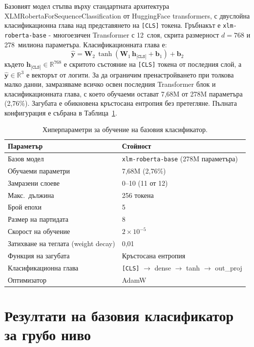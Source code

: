 \documentclass[12pt,a4paper]{report}
\begin{document}
Базовият модел стъпва върху стандартната архитектура XLMRobertaForSequenceClassification от HuggingFace transformers, с двуслойна класификационна глава над представянето на \texttt{[CLS]} токена. Гръбнакът е \texttt{xlm-roberta-base} - многоезичен Transformer с 12~слоя, скрита размерност $d=768$ и 278~милиона параметъра. Класификационната глава е:
\begin{equation}
  \hat{\mathbf{y}} = \mathbf{W}_2 \, \tanh(\mathbf{W}_1 \, \mathbf{h}_{\texttt{[CLS]}} + \mathbf{b}_1) + \mathbf{b}_2
  \label{eq:classifier_head}
\end{equation}
където $\mathbf{h}_{\texttt{[CLS]}} \in \mathbb{R}^{768}$ е скритото състояние на \texttt{[CLS]} токена от последния слой, а $\hat{\mathbf{y}} \in \mathbb{R}^3$ е векторът от логити. За да ограничим пренастройването при толкова малко данни, замразяваме всичко освен последния Transformer блок и класификационната глава, с което обучаеми остават 7,68M от 278M параметъра (2,76\%). Загубата е обикновена кръстосана ентропия без претегляне. Пълната конфигурация е събрана в Таблица~\ref{tab:baseline_hyperparams}.

\begin{table}[H]
\centering
\caption{Хиперпараметри за обучение на базовия класификатор.}
\label{tab:baseline_hyperparams}
\begin{tabular}{ll}
\toprule
\textbf{Параметър} & \textbf{Стойност} \\
\midrule
Базов модел & \texttt{xlm-roberta-base} (278M параметъра) \\
Обучаеми параметри & 7,68M (2,76\%) \\
Замразени слоеве & 0--10 (11 от 12) \\
Макс.\ дължина & 256 токена \\
Брой епохи & 5 \\
Размер на партидата & 8 \\
Скорост на обучение & $2 \times 10^{-5}$ \\
Затихване на теглата (weight decay) & 0,01 \\
Функция на загубата & Кръстосана ентропия \\
Класификационна глава & \texttt{[CLS]} $\rightarrow$ dense $\rightarrow$ tanh $\rightarrow$ out\_proj \\
Оптимизатор & AdamW \\
\bottomrule
\end{tabular}
\end{table}


\section{Резултати на базовия класификатор за грубо ниво}
\label{sec:baseline_results}
\end{document}
